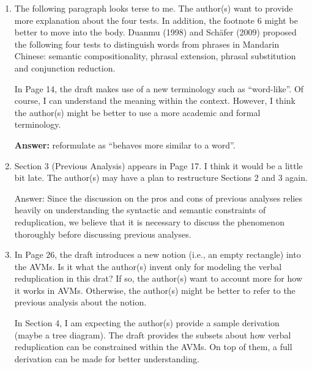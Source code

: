 \documentclass[fleqn,twoside]{article}
\begin{document}
\begin{enumerate}
\item
The following paragraph looks terse to me. The author(s) want to provide more explanation about the four tests. In addition, the footnote 6 might be better to move into the body.
Duanmu (1998) and Schäfer (2009) proposed the following four tests to distinguish words from phrases
in Mandarin Chinese: semantic compositionality, phrasal extension, phrasal substitution and
conjunction reduction.

In Page 14, the draft makes use of a new terminology such as “word-like”. Of course, I can understand the meaning within the context. However, I think the author(s) might be better to use a more academic and formal terminology.

\textbf{Answer:} reformulate as ``behaves more similar to a word''.

\item
Section 3 (Previous Analysis) appears in Page 17. I think it would be a little bit late. The author(s) may have a plan to restructure Sections 2 and 3 again.

\noindent
Answer: Since the discussion on the pros and cons of previous analyses relies heavily on understanding the syntactic and semantic constraints of reduplication, we believe that it is necessary to discuss the phenomenon thoroughly before discussing previous analyses.

\item
In Page 26, the draft introduces a new notion (i.e., an empty rectangle) into the AVMs. Is it what the author(s) invent only for modeling the verbal reduplication in this drat? If so, the author(s) want to account more for how it works in AVMs. Otherwise, the author(s) might be better to refer to the previous analysis about the notion.

In Section 4, I am expecting the author(s) provide a sample derivation (maybe a tree diagram). The draft provides the subsets about how verbal reduplication can be constrained within the AVMs. On top of them, a full derivation can be made for better understanding.

\end{enumerate}

{\sloppy
\printbibliography[heading=subbibliography,notkeyword=this]
}
\end{document}
